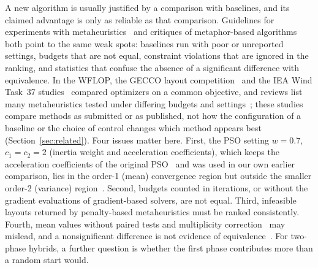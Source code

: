 A new algorithm is usually justified by a comparison with baselines, and its claimed advantage is only as reliable as that comparison. Guidelines for experiments with metaheuristics~\cite{Hooker1995,Derrac2011,BartzBeielstein2020,LaTorre2021} and critiques of metaphor-based algorithms~\cite{Sorensen2015,Aranha2022} both point to the same weak spots: baselines run with poor or unreported settings, budgets that are not equal, constraint violations that are ignored in the ranking, and statistics that confuse the absence of a significant difference with equivalence. In the WFLOP, the GECCO layout competition~\cite{Wilson2018} and the IEA Wind Task~37 studies~\cite{Baker2019,Thomas2023} compared optimizers on a common objective, and reviews list many metaheuristics tested under differing budgets and settings~\cite{Azlan2021}; these studies compare methods as submitted or as published, not how the configuration of a baseline or the choice of control changes which method appears best (Section~\ref{sec:related}). Four issues matter here. First, the PSO setting $w=0.7$, $c_1=c_2=2$ (inertia weight and acceleration coefficients), which keeps the acceleration coefficients of the original PSO~\cite{Kennedy1995} and was used in our own earlier comparison, lies in the order-1 (mean) convergence region but outside the smaller order-2 (variance) region~\cite{Poli2009,Bonyadi2017,Cleghorn2018}. Second, budgets counted in iterations, or without the gradient evaluations of gradient-based solvers, are not equal. Third, infeasible layouts returned by penalty-based metaheuristics must be ranked consistently. Fourth, mean values without paired tests and multiplicity correction~\cite{Benavoli2016} may mislead, and a nonsignificant difference is not evidence of equivalence~\cite{Lakens2017}. For two-phase hybrids, a further question is whether the first phase contributes more than a random start would.

